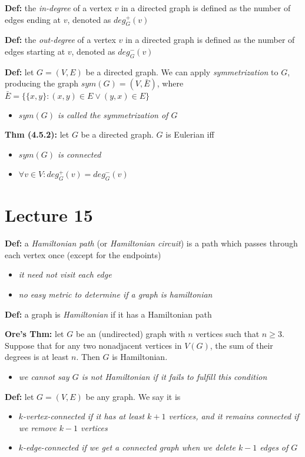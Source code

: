 \documentclass[12pt]{article}
\begin{document}
\textbf{Def: }the \emph{in-degree} of a vertex $v$ in a directed graph is defined as the number of edges ending at $v$, denoted as $deg_G^+(v)$

\textbf{Def: }the \emph{out-degree} of a vertex $v$ in a directed graph is defined as the number of edges starting at $v$, denoted as $deg_G^-(v)$

\textbf{Def: }let $G = (V, E)$ be a directed graph. We can apply \emph{symmetrization} to $G$, producing the graph $sym(G) = (V, \bar{E})$, where $\bar{E} = \{ \{ x, y \} : (x, y) \in E \lor (y, x) \in E \}$
\begin{itemize}
    \item \emph{$sym(G)$ is called the symmetrization of $G$}
\end{itemize}

\textbf{Thm (4.5.2): }let $G$ be a directed graph. $G$ is Eulerian iff
\begin{itemize}
    \item \emph{$sym(G)$ is connected}
    \item \emph{$\forall v \in V : deg_G^+(v) = deg_G^-(v)$}
\end{itemize}
\clearpage

\section{Lecture 15}
\textbf{Def: }a \emph{Hamiltonian path} (or \emph{Hamiltonian circuit}) is a path which passes through each vertex once (except for the endpoints)
\begin{itemize}
    \item \emph{it need not visit each edge}
    \item \emph{no easy metric to determine if a graph is hamiltonian}
\end{itemize}

\textbf{Def: }a graph is \emph{Hamiltonian} if it has a Hamiltonian path

\textbf{Ore's Thm: }let $G$ be an (undirected) graph with $n$ vertices such that $n \geq 3$. Suppose that for any two nonadjacent vertices in $V(G)$, the sum of their degrees is at least $n$. Then $G$ is Hamiltonian.
\begin{itemize}
    \item \emph{we cannot say $G$ is not Hamiltonian if it fails to fulfill this condition}
\end{itemize}

\textbf{Def: }let $G = (V, E)$ be any graph. We say it is
\begin{itemize}
    \item \emph{$k$-vertex-connected if it has at least $k + 1$ vertices, and it remains connected if we remove $k - 1$ vertices}
    \item \emph{$k$-edge-connected if we get a connected graph when we delete $k - 1$ edges of $G$}
\end{itemize}
\end{document}
